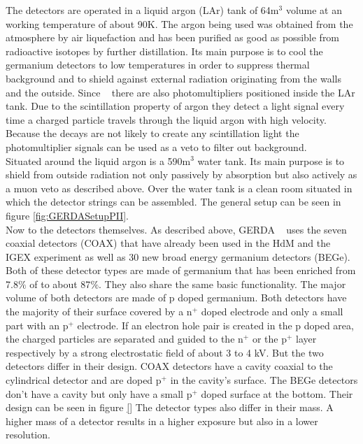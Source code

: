 The detectors are operated in a liquid argon (LAr) tank of 64m$^3$ volume at an working temperature of about 90K.
The argon being used was obtained from the atmosphere by air liquefaction and has been purified as good as possible from radioactive isotopes by further distillation.
Its main purpose is to cool the germanium detectors to low temperatures in order to suppress thermal background and to shield against external radiation originating from the walls and the outside. 
Since \PII~ there are also photomultipliers positioned inside the LAr tank.
Due to the scintillation property of argon they detect a light signal every time a charged particle travels through the liquid argon with high velocity.
Because the \onbb decays are not likely to create any scintillation light the photomultiplier signals can be used as a veto to filter out background.
\\

Situated around the liquid argon is a 590m$^3$ water tank.
Its main purpose is to shield from outside radiation not only passively by absorption but also actively as a muon veto as described above.
Over the water tank is a clean room situated in which the detector strings can be assembled.  
The general setup can be seen in figure \ref{fig:GERDASetupPII}.
\\

Now to the detectors themselves.
As described above, GERDA \PII~ uses the seven coaxial detectors (COAX) that have already been used in the HdM and the IGEX experiment as well as 30 new broad energy germanium detectors (BEGe).
Both of these detector types are made of germanium that has been enriched from 7.8$\%$ of  to about 87$\%$.
They also share the same basic functionality.
The major volume of both detectors are made of p doped germanium.
Both detectors have the majority of their surface covered by a n$^+$ doped electrode and only a small part with an p$^+$ electrode.
If an electron hole pair is created in the p doped area, the charged particles are separated and guided to the n$^+$ or the p$^+$ layer respectively by a strong electrostatic field of about 3 to 4 kV.
But the two detectors differ in their design.
COAX detectors have a cavity coaxial to the cylindrical detector and are doped p$^+$ in the cavity's surface.
The BEGe detectors don't have a cavity but only have a small p$^+$ doped surface at the bottom.
Their design can be seen in figure \ref{}
The detector types also differ in their mass.
A higher mass of a detector results in a higher exposure but also in a lower resolution.
  
